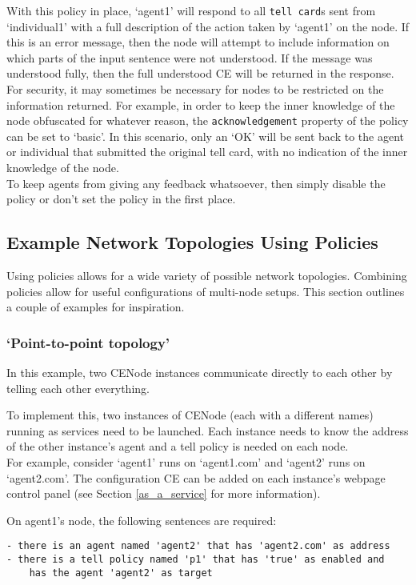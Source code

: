 \documentclass{scrartcl}
\begin{document}
With this policy in place, `agent1' will respond to all \texttt{tell card}s sent from `individual1' with a full description of the action taken by `agent1' on the node. If this is an error message, then the node will attempt to include information on which parts of the input sentence were not understood. If the message was understood fully, then the full understood CE will be returned in the response.\\

For security, it may sometimes be necessary for nodes to be restricted on the information returned. For example, in order to keep the inner knowledge of the node obfuscated for whatever reason, the \texttt{acknowledgement} property of the policy can be set to `basic'. In this scenario, only an `OK' will be sent back to the agent or individual that submitted the original tell card, with no indication of the inner knowledge of the node.\\

To keep agents from giving any feedback whatsoever, then simply disable the policy or don't set the policy in the first place.

\subsection{Example Network Topologies Using Policies}
Using policies allows for a wide variety of possible network topologies. Combining policies allow for useful configurations of multi-node setups. This section outlines a couple of examples for inspiration.

\subsubsection{`Point-to-point topology'}
In this example, two CENode instances communicate directly to each other by telling each other everything.

To implement this, two instances of CENode (each with a different names) running as services need to be launched. Each instance needs to know the address of the other instance's agent and a tell policy is needed on each node.\\

For example, consider `agent1' runs on `agent1.com' and `agent2' runs on `agent2.com'. The configuration CE can be added on each instance's webpage control panel (see Section \ref{as_a_service} for more information).

On agent1's node, the following sentences are required:\\
\begin{verbatim}
- there is an agent named 'agent2' that has 'agent2.com' as address
- there is a tell policy named 'p1' that has 'true' as enabled and 
    has the agent 'agent2' as target
\end{verbatim}
\end{document}
